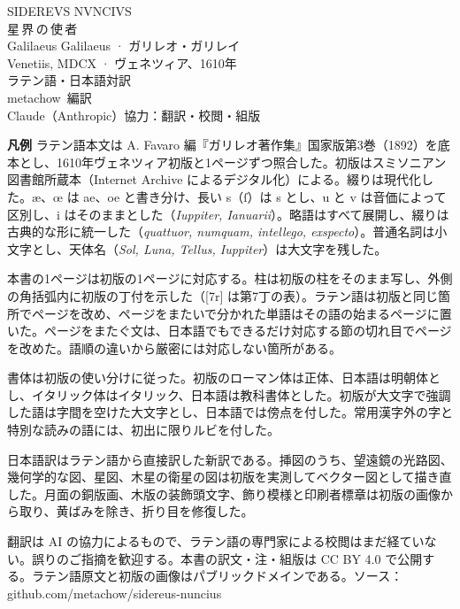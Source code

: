 \thispagestyle{empty}
\jaliningfigures   %
\begin{center}
\vspace*{26mm}
{\fontsize{26}{30}\selectfont{}SIDEREVS NVNCIVS}\\[4mm]
{\fontsize{20}{24}\selectfont 星\,界\,の\,使\,者}\\[10mm]
{\large Galilaeus Galilaeus · ガリレオ・ガリレイ}\\[2mm]
{\small Venetiis, MDCX · ヴェネツィア、1610年}\\[20mm]
{\color{edgray}\small ラテン語・日本語対訳}\\[6mm]
{\small metachow\ 編訳}\\[1mm]
{\color{edgray}\footnotesize Claude（Anthropic）協力：翻訳・校閲・組版}
\end{center}

\vfill
\noindent\begin{minipage}{\textwidth}
\small\color{edgray}\setlength{\parindent}{1em}\linespread{1.25}\selectfont\sloppy
\textbf{凡例}\quad
ラテン語本文は A. Favaro 編『ガリレオ著作集』国家版第3巻（1892）を底本とし、1610年ヴェネツィア初版と1ページずつ照合した。初版はスミソニアン図書館所蔵本（Internet Archive によるデジタル化）による。綴りは現代化した。æ、œ は ae、oe と書き分け、長い s（ſ）は s とし、u と v は音価によって区別し、i はそのままとした（\textit{Iuppiter, Ianuarii}）。略語はすべて展開し、綴りは古典的な形に統一した（\textit{quattuor, numquam, intellego, exspecto}）。普通名詞は小文字とし、天体名（\textit{Sol, Luna, Tellus, Iuppiter}）は大文字を残した。

本書の1ページは初版の1ページに対応する。柱は初版の柱をそのまま写し、外側の角括弧内に初版の丁付を示した（[7r] は第7丁の表）。ラテン語は初版と同じ箇所でページを改め、ページをまたいで分かれた単語はその語の始まるページに置いた。ページをまたぐ文は、日本語でもできるだけ対応する節の切れ目でページを改めた。語順の違いから厳密には対応しない箇所がある。

書体は初版の使い分けに従った。初版のローマン体は正体、日本語は明朝体とし、イタリック体はイタリック、日本語は教科書体とした。初版が大文字で強調した語は字間を空けた大文字とし、日本語では傍点を付した。常用漢字外の字と特別な読みの語には、初出に限りルビを付した。

日本語訳はラテン語から直接訳した新訳である。挿図のうち、望遠鏡の光路図、幾何学的な図、星図、木星の衛星の図は初版を実測してベクター図として描き直した。月面の銅版画、木版の装飾頭文字、飾り模様と印刷者標章は初版の画像から取り、黄ばみを除き、折り目を修復した。

翻訳は AI の協力によるもので、ラテン語の専門家による校閲はまだ経ていない。誤りのご指摘を歓迎する。本書の訳文・注・組版は CC BY 4.0 で公開する。ラテン語原文と初版の画像はパブリックドメインである。ソース：github.com/metachow/sidereus-nuncius
\end{minipage}
\cleardoublepage
